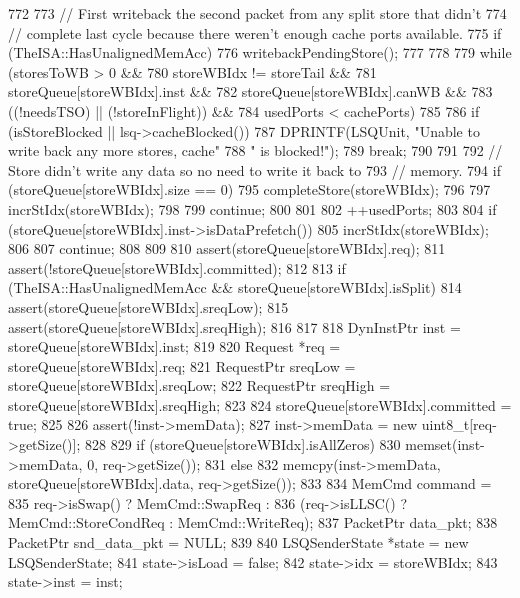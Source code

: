 \begin{DoxyCode}
772 {
773     // First writeback the second packet from any split store that didn't
774     // complete last cycle because there weren't enough cache ports available.
775     if (TheISA::HasUnalignedMemAcc) {
776         writebackPendingStore();
777     }
778 
779     while (storesToWB > 0 &&
780            storeWBIdx != storeTail &&
781            storeQueue[storeWBIdx].inst &&
782            storeQueue[storeWBIdx].canWB &&
783            ((!needsTSO) || (!storeInFlight)) &&
784            usedPorts < cachePorts) {
785 
786         if (isStoreBlocked || lsq->cacheBlocked()) {
787             DPRINTF(LSQUnit, "Unable to write back any more stores, cache"
788                     " is blocked!\n");
789             break;
790         }
791 
792         // Store didn't write any data so no need to write it back to
793         // memory.
794         if (storeQueue[storeWBIdx].size == 0) {
795             completeStore(storeWBIdx);
796 
797             incrStIdx(storeWBIdx);
798 
799             continue;
800         }
801 
802         ++usedPorts;
803 
804         if (storeQueue[storeWBIdx].inst->isDataPrefetch()) {
805             incrStIdx(storeWBIdx);
806 
807             continue;
808         }
809 
810         assert(storeQueue[storeWBIdx].req);
811         assert(!storeQueue[storeWBIdx].committed);
812 
813         if (TheISA::HasUnalignedMemAcc && storeQueue[storeWBIdx].isSplit) {
814             assert(storeQueue[storeWBIdx].sreqLow);
815             assert(storeQueue[storeWBIdx].sreqHigh);
816         }
817 
818         DynInstPtr inst = storeQueue[storeWBIdx].inst;
819 
820         Request *req = storeQueue[storeWBIdx].req;
821         RequestPtr sreqLow = storeQueue[storeWBIdx].sreqLow;
822         RequestPtr sreqHigh = storeQueue[storeWBIdx].sreqHigh;
823 
824         storeQueue[storeWBIdx].committed = true;
825 
826         assert(!inst->memData);
827         inst->memData = new uint8_t[req->getSize()];
828 
829         if (storeQueue[storeWBIdx].isAllZeros)
830             memset(inst->memData, 0, req->getSize());
831         else
832             memcpy(inst->memData, storeQueue[storeWBIdx].data, req->getSize());
833 
834         MemCmd command =
835             req->isSwap() ? MemCmd::SwapReq :
836             (req->isLLSC() ? MemCmd::StoreCondReq : MemCmd::WriteReq);
837         PacketPtr data_pkt;
838         PacketPtr snd_data_pkt = NULL;
839 
840         LSQSenderState *state = new LSQSenderState;
841         state->isLoad = false;
842         state->idx = storeWBIdx;
843         state->inst = inst;
}}
\end{DoxyCode}
